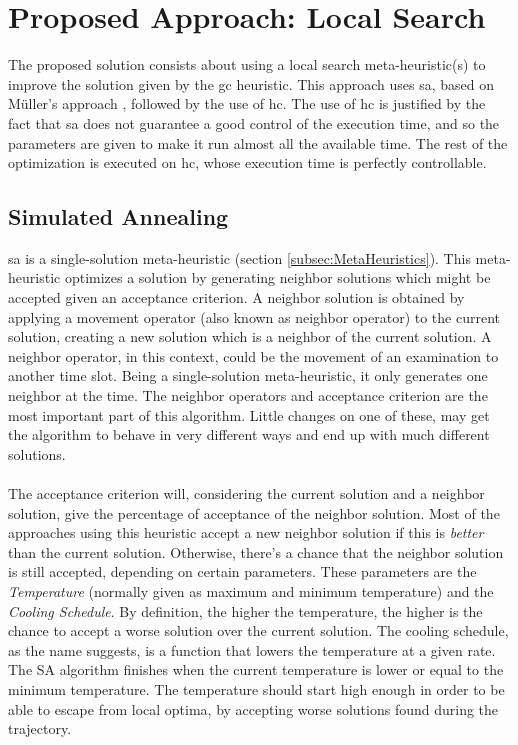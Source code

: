 \chapter{Proposed Approach: Local Search}
\label{chap:LocalSearch}
\thispagestyle{plain}

The proposed solution consists about using a local search meta-heuristic(s) to improve the solution given by the \gls{gc} heuristic. This approach uses \gls{sa}, based on M\"{u}ller's approach \cite{Mueller2009}, followed by the use of \gls{hc}. The use of \gls{hc} is justified by the fact that \gls{sa} does not guarantee a good control of the execution time, and so the parameters are given to make it run almost all the available time. The rest of the optimization is executed on \gls{hc}, whose execution time is perfectly controllable.

\section{Simulated Annealing}
\label{sec:SimulatedAnnealing}

\gls{sa} is a single-solution meta-heuristic (section \ref{subsec:MetaHeuristics}). This meta-heuristic optimizes a solution by generating neighbor solutions which might be accepted given an acceptance criterion. A neighbor solution is obtained by applying a movement operator (also known as neighbor operator) to the current solution, creating a new solution which is a neighbor of the current solution. A neighbor operator, in this context, could be the movement of an examination to another time slot. Being a single-solution meta-heuristic, it only generates one neighbor at the time. The neighbor operators and acceptance criterion are the most important part of this algorithm. Little changes on one of these, may get the algorithm to behave in very different ways and end up with much different solutions.\\
\\
The acceptance criterion will, considering the current solution and a neighbor solution, give the percentage of acceptance of the neighbor solution. Most of the approaches using this heuristic accept a new neighbor solution if this is \textit{better} than the current solution. Otherwise, there's a chance that the neighbor solution is still accepted, depending on certain parameters. These parameters are the \textit{Temperature} (normally given as maximum and minimum temperature) and the \textit{Cooling Schedule}. By definition, the higher the temperature, the higher is the chance to accept a worse solution over the current solution. The cooling schedule, as the name suggests, is a function that lowers the temperature at a given rate. The SA algorithm finishes when the current temperature is lower or equal to the minimum temperature. The temperature should start high enough in order to be able to escape from local optima, by accepting worse solutions found during the trajectory.

